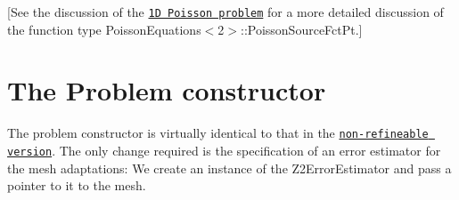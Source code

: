 \mbox{[}See the discussion of the \href{../../one_d_poisson/html/index.html}{\tt 1D Poisson problem} for a more detailed discussion of the function type Poisson\+Equations$<$2$>$\+::\+Poisson\+Source\+Fct\+Pt.\mbox{]}



 

\hypertarget{index_constructor}{}\section{The Problem constructor}\label{index_constructor}
The problem constructor is virtually identical to that in the \href{../../../poisson/two_d_poisson/html/index.html}{\tt non-\/refineable version}. The only change required is the specification of an error estimator for the mesh adaptations\+: We create an instance of the {\ttfamily Z2\+Error\+Estimator} and pass a pointer to it to the mesh.


